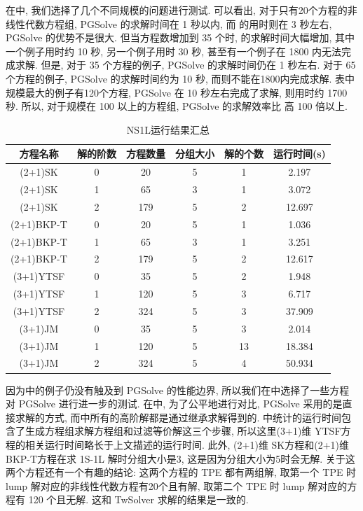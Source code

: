 在中, 我们选择了几个不同规模的问题进行测试. 可以看出, 对于只有20个方程的非线性代数方程组, PGSolve 的求解时间在 1 秒以内, 而  的用时则在 3 秒左右, PGSolve 的优势不是很大. 但当方程数增加到 35 个时,  的求解时间大幅增加, 其中一个例子用时约 10 秒, 另一个例子用时 30 秒, 甚至有一个例子在 1800 内无法完成求解. 但是, 对于 35 个方程的例子, PGSolve 的求解时间仍在 1 秒左右. 对于 65 个方程的例子, PGSolve 的求解时间约为 10 秒, 而则不能在1800内完成求解. 表中规模最大的例子有120个方程, PGSolve 在 10 秒左右完成了求解, 则用时约 1700 秒. 所以, 对于规模在 100 以上的方程组, PGSolve 的求解效率比  高 100 倍以上.

\begin{table}[htbp]
\centering
\caption{NS1L运行结果汇总} \label{NS1L-tb}
\begin{tabular}{cccccc}
\hline
方程名称    & 解的阶数 & 方程数量 & 分组大小 & 解的个数 & 运行时间(s) \\ 
\hline 
(2+1)SK & 0 & 20 & 5 & 1 & 2.197 \\
(2+1)SK & 1 & 65 & 3 & 1 & 3.072 \\
(2+1)SK & 2 & 179 & 5 & 2 & 12.697 \\
(2+1)BKP-T & 0 & 20 & 5 & 1 & 1.036 \\
(2+1)BKP-T & 1 & 65 & 3 & 1 & 3.251 \\
(2+1)BKP-T & 2 & 179 & 5 & 2 & 12.617 \\
(3+1)YTSF & 0 & 35 & 5 & 2 & 1.948 \\
(3+1)YTSF & 1 & 120 & 5 & 3 & 6.717 \\
(3+1)YTSF & 2 & 324 & 5 & 3 & 37.909 \\
(3+1)JM & 0 & 35 & 5 & 3 & 2.014 \\
(3+1)JM & 1 & 120 & 5 & 13 & 18.384 \\
(3+1)JM & 2 & 324 & 5 & 4 & 50.934 \\
\hline 
\end{tabular}
\end{table}

因为中的例子仍没有触及到 PGSolve 的性能边界, 所以我们在中选择了一些方程对 PGSolve 进行进一步的测试. 在中, 为了公平地进行对比, PGSolve 采用的是直接求解的方式, 而中所有的高阶解都是通过继承求解得到的. 中统计的运行时间包含了生成方程组\D 求解方程组和过滤等价解这三个步骤, 所以这里(3+1)维 YTSF方程的相关运行时间略长于上文描述的运行时间. 此外, (2+1)维 SK方程和(2+1)维 BKP-T方程在求 1S-1L 解时分组大小是3, 这是因为分组大小为5时会无解. 关于这两个方程还有一个有趣的结论: 这两个方程的 TPE 都有两组解, 取第一个 TPE 时 lump 解对应的非线性代数方程有20个且有解, 取第二个 TPE 时 lump 解对应的方程有 120 个且无解. 这和 TwSolver 求解的结果是一致的. 



